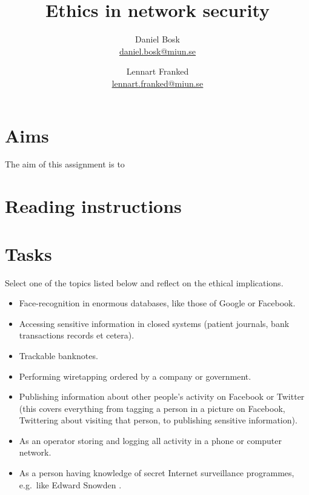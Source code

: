\documentclass[a4paper,nocourse]{miunasgn}
\title{Ethics in network security}
\author{Daniel Bosk\\
  {\small\href{mailto:daniel.bosk@miun.se}{daniel.bosk@miun.se}}
  \and
  Lennart Franked\\
  {\small\href{mailto:daniel.bosk@miun.se}{lennart.franked@miun.se}}
}
\date{\svnId}
\begin{document}
\maketitle
\thispagestyle{foot}
\tableofcontents

\section{Aims}
The aim of this assignment is to
\begin{itemize}
    
\end{itemize}


\section{Reading instructions}
\label{sec:Reading}



\section{Tasks}
\label{sec:Tasks}
Select one of the topics listed below and reflect on the
ethical implications.
\begin{itemize}
  \item Face-recognition in enormous databases, like those of Google or
    Facebook.

  \item Accessing sensitive information in closed systems (patient journals,
    bank transactions records et cetera).

  \item Trackable banknotes.

  \item Performing wiretapping ordered by a company or government.

  \item Publishing information about other people's activity on Facebook or
    Twitter (this covers everything from tagging a person in a picture
    on Facebook, Twittering about visiting that person, to publishing
    sensitive information).

  \item As an operator storing and logging all activity in a phone or computer 
    network.

  \item As a person having knowledge of secret Internet surveillance 
    programmes, e.g.\ like Edward Snowden 
    \cite{landau2013snowden,landau2014highlights}.
\end{itemize}
\end{document}
